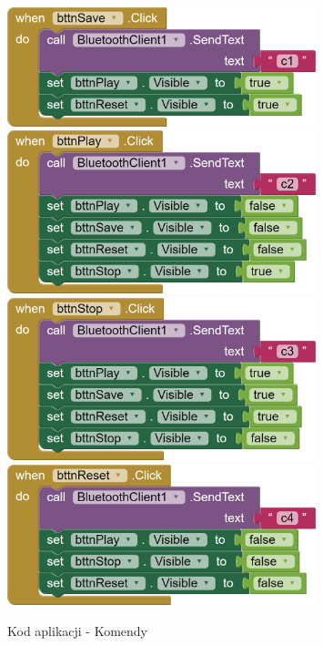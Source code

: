 \documentclass[11pt,titlepage,a4paper]{article}
\begin{document}
\newpage

\begin{figure}[p]
    \begin{center}
        \includegraphics[width=0.8\textwidth]{img/app_src/commands/Save.png}
        \includegraphics[width=0.8\textwidth]{img/app_src/commands/Play.png}
        \includegraphics[width=0.8\textwidth]{img/app_src/commands/Stop.png}
        \includegraphics[width=0.8\textwidth]{img/app_src/commands/Reset.png}
    \end{center}
    \caption{Kod aplikacji - Komendy}
    \label{AppKomendy}
\end{figure}
\end{document}
